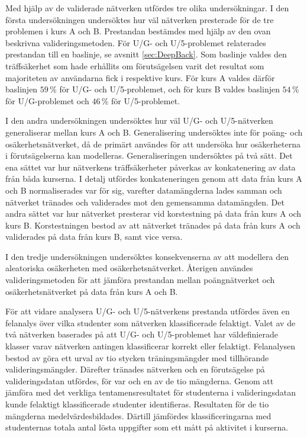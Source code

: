 Med hjälp av de validerade nätverken utfördes tre olika undersökningar. I den första undersökningen undersöktes hur väl nätverken presterade för de tre problemen i kurs A och B. Prestandan bestämdes med hjälp av den ovan beskrivna valideringsmetoden. För U/G- och U/5-problemet relaterades prestandan till en baslinje, se avsnitt \ref{sec:DeepBack}. Som baslinje valdes den träffsäkerhet som hade erhållits om förutsägelsen varit det resultat som majoriteten av användarna fick i respektive kurs. För kurs A valdes därför baslinjen $59 \, \%$ för U/G- och U/5-problemet, och för kurs B valdes baslinjen $54 \, \%$ för U/G-problemet och $46 \, \%$ för U/5-problemet. 

I den andra undersökningen undersöktes hur väl U/G- och U/5-nätverken generaliserar mellan kurs A och B. Generalisering undersöktes inte för poäng- och osäkerhetsnätverket, då de primärt användes för att undersöka hur osäkerheterna i förutsägelserna kan modelleras. Generaliseringen undersöktes på två sätt. Det ena sättet var hur nätverkens träffsäkerheter påverkas av konkatenering av data från båda kurserna. I detalj utfördes konkateneringen genom att data från kurs A och B normaliserades var för sig, varefter datamängderna lades samman och nätverket tränades och validerades mot den gemensamma datamängden. Det andra sättet var hur nätverket presterar vid korstestning på data från kurs A och kurs B. Korstestningen bestod av att nätverket tränades på data från kurs A och validerades på data från kurs B, samt vice versa. 

I den tredje undersökningen undersöktes konsekvenserna av att modellera den aleatoriska osäkerheten med osäkerhetsnätverket. Återigen användes valideringsmetoden för att jämföra prestandan mellan poängnätverket och osäkerhetsnätverket på data från kurs A och B. 

För att vidare analysera U/G- och U/5-nätverkens prestanda utfördes även en felanalys över vilka studenter som nätverken klassificerade felaktigt. Valet av de två nätverken baserades på att U/G- och U/5-problemet har väldefinierade klasser varav nätverken antingen klassificerar korrekt eller felaktigt. Felanalysen bestod av göra ett urval av tio stycken träningsmängder med tillhörande valideringsmängder. Därefter tränades nätverken och en förutsägelse på valideringsdatan utfördes, för var och en av de tio mängderna. Genom att jämföra med det verkliga tentamensresultatet för studenterna i valideringsdatan kunde felaktigt klassificerade studenter identifieras. Resultaten för de tio mängderna medelvärdesbildades. Därtill jämfördes klassificeringarna med studenternas totala antal lösta uppgifter som ett mått på aktivitet i kurserna.


